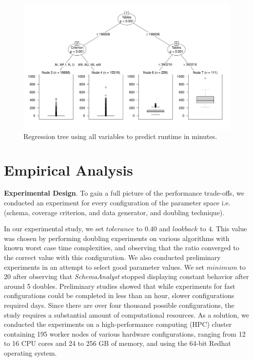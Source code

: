 

\begin{figure}[ht]
\centering
  \centering
  \includegraphics[width=.75\linewidth]{diagrams/AllTree.pdf}
  \caption{Regression tree using all variables to predict runtime in
  minutes. \vspace{-.15in}}
  \label{fig:atree}
\end{figure}

\section{Empirical Analysis}

\textbf{Experimental Design}. To gain a full picture of the performance trade-offs, we conducted an experiment for every configuration
of the parameter space i.e. (schema, coverage criterion, and data generator, and doubling technique). 

In our experimental study, we set $\mathit{tolerance}$ to $0.40$ and $\mathit{lookback}$ to $4$. This value was chosen
by performing doubling experiments on various algorithms with known worst case time complexities, and observing that the
ratio converged to the correct value with this configuration.  We also conducted preliminary experiments in an attempt
to select good parameter values. We set $\mathit{minimum}$ to $20$ after observing that \textit{SchemaAnalyst} stopped
displaying constant behavior after around 5 doubles.  Preliminary studies showed that while experiments for fast
configurations could be completed in less than an hour, slower configurations required days.  Since there are over four
thousand possible configurations, the study requires a substantial amount of computational resources.  As a solution, we
conducted the experiments on a high-performance computing (HPC) cluster containing 195 worker nodes of various hardware
configurations, ranging from 12 to 16 CPU cores and 24 to 256 GB of memory, and using the 64-bit Redhat operating
system.
